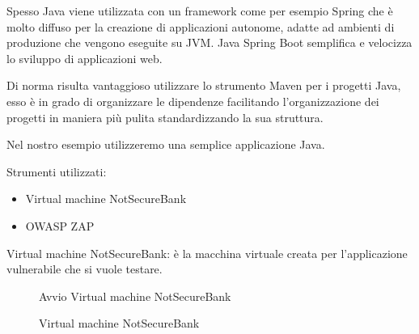 Spesso Java viene utilizzata con un framework come per esempio Spring che è molto diffuso per la creazione di applicazioni autonome, adatte ad ambienti di produzione che vengono eseguite su JVM. Java Spring Boot semplifica e velocizza lo sviluppo di applicazioni web. 

Di norma risulta vantaggioso utilizzare lo strumento Maven per i progetti Java, esso è in grado di organizzare le dipendenze facilitando l’organizzazione dei progetti in maniera più pulita standardizzando la sua struttura.

Nel nostro esempio utilizzeremo una semplice applicazione Java. 

Strumenti utilizzati:
\begin{itemize}
    \item Virtual machine NotSecureBank
    \item OWASP ZAP
\end{itemize}  
Virtual machine NotSecureBank:  è la macchina virtuale creata per l’applicazione vulnerabile che si vuole testare.
\begin{figure}[H]
    \caption{Avvio Virtual machine NotSecureBank}
    \label{fig:avviovm}
\end{figure}
\begin{figure}[H]
    \caption{Virtual machine NotSecureBank}
    \label{fig:vm}
\end{figure}
